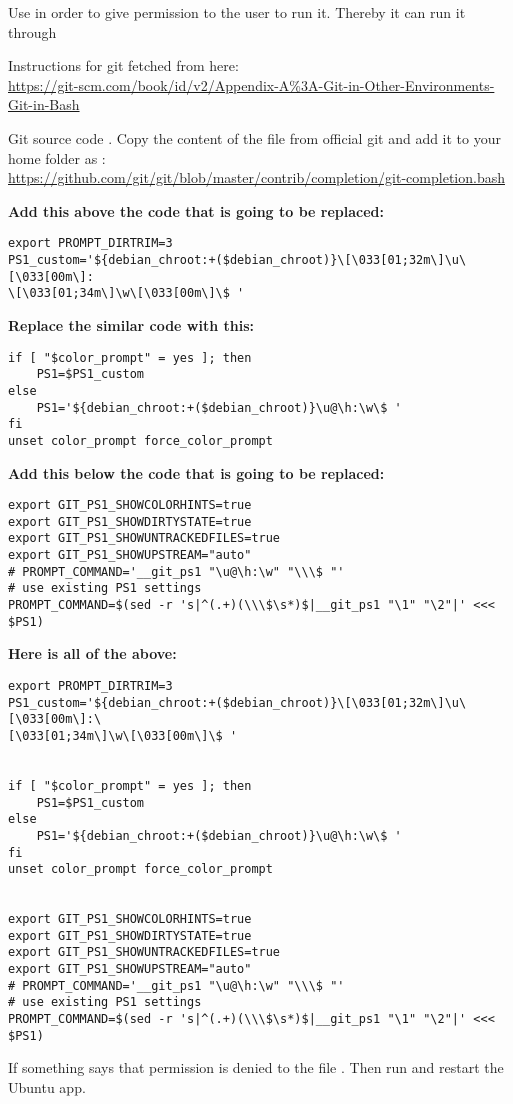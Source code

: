 Use  in order to give permission to the user to run it. Thereby it can run it through 

Instructions for git fetched from here:\\
\url{https://git-scm.com/book/id/v2/Appendix-A\%3A-Git-in-Other-Environments-Git-in-Bash}

Git source code . Copy the content of the file from official git and add it to your home folder as :\\
\url{https://github.com/git/git/blob/master/contrib/completion/git-completion.bash}



\textbf{Add this above the code that is going to be replaced:}
\begin{verbatim}
export PROMPT_DIRTRIM=3
PS1_custom='${debian_chroot:+($debian_chroot)}\[\033[01;32m\]\u\[\033[00m\]:
\[\033[01;34m\]\w\[\033[00m\]\$ '
\end{verbatim}

\textbf{Replace the similar code with this:}
\begin{verbatim}
if [ "$color_prompt" = yes ]; then
    PS1=$PS1_custom
else
    PS1='${debian_chroot:+($debian_chroot)}\u@\h:\w\$ '
fi
unset color_prompt force_color_prompt
\end{verbatim}

\textbf{Add this below the code that is going to be replaced:}
\begin{verbatim}
export GIT_PS1_SHOWCOLORHINTS=true
export GIT_PS1_SHOWDIRTYSTATE=true
export GIT_PS1_SHOWUNTRACKEDFILES=true
export GIT_PS1_SHOWUPSTREAM="auto"
# PROMPT_COMMAND='__git_ps1 "\u@\h:\w" "\\\$ "'
# use existing PS1 settings
PROMPT_COMMAND=$(sed -r 's|^(.+)(\\\$\s*)$|__git_ps1 "\1" "\2"|' <<< $PS1)
\end{verbatim}

\newpage
\textbf{Here is all of the above:}
\begin{verbatim}
export PROMPT_DIRTRIM=3
PS1_custom='${debian_chroot:+($debian_chroot)}\[\033[01;32m\]\u\[\033[00m\]:\
[\033[01;34m\]\w\[\033[00m\]\$ '


if [ "$color_prompt" = yes ]; then
    PS1=$PS1_custom
else
    PS1='${debian_chroot:+($debian_chroot)}\u@\h:\w\$ '
fi
unset color_prompt force_color_prompt


export GIT_PS1_SHOWCOLORHINTS=true
export GIT_PS1_SHOWDIRTYSTATE=true
export GIT_PS1_SHOWUNTRACKEDFILES=true
export GIT_PS1_SHOWUPSTREAM="auto"
# PROMPT_COMMAND='__git_ps1 "\u@\h:\w" "\\\$ "'
# use existing PS1 settings
PROMPT_COMMAND=$(sed -r 's|^(.+)(\\\$\s*)$|__git_ps1 "\1" "\2"|' <<< $PS1)
\end{verbatim}

If something says that permission is denied to the file . Then run  and restart the Ubuntu app.







